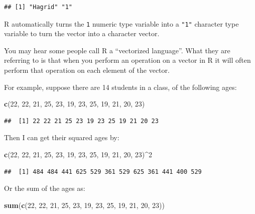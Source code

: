 \documentclass[
]{book}
\newenvironment{Shaded}{\begin{snugshade}}{\end{snugshade}}
\newcommand{\DecValTok}[1]{\textcolor[rgb]{0.00,0.00,0.81}{#1}}
\newcommand{\FunctionTok}[1]{\textcolor[rgb]{0.13,0.29,0.53}{\textbf{#1}}}
\newcommand{\NormalTok}[1]{#1}
\newcommand{\SpecialCharTok}[1]{\textcolor[rgb]{0.81,0.36,0.00}{\textbf{#1}}}
\begin{document}
\begin{verbatim}
## [1] "Hagrid" "1"
\end{verbatim}

R automatically turns the \texttt{1} numeric type variable into a \texttt{"1"} character type variable to turn the vector into a character vector.

You may hear some people call R a ``vectorized language''. What they are referring to is that when you perform an operation on a vector in R it will often perform that operation on each element of the vector.

For example, suppose there are 14 students in a class, of the following ages:

\begin{Shaded}
\begin{Highlighting}[]
\FunctionTok{c}\NormalTok{(}\DecValTok{22}\NormalTok{, }\DecValTok{22}\NormalTok{, }\DecValTok{21}\NormalTok{, }\DecValTok{25}\NormalTok{, }\DecValTok{23}\NormalTok{, }\DecValTok{19}\NormalTok{, }\DecValTok{23}\NormalTok{, }\DecValTok{25}\NormalTok{, }\DecValTok{19}\NormalTok{, }\DecValTok{21}\NormalTok{, }\DecValTok{20}\NormalTok{, }\DecValTok{23}\NormalTok{)}
\end{Highlighting}
\end{Shaded}

\begin{verbatim}
##  [1] 22 22 21 25 23 19 23 25 19 21 20 23
\end{verbatim}

Then I can get their squared ages by:

\begin{Shaded}
\begin{Highlighting}[]
\FunctionTok{c}\NormalTok{(}\DecValTok{22}\NormalTok{, }\DecValTok{22}\NormalTok{, }\DecValTok{21}\NormalTok{, }\DecValTok{25}\NormalTok{, }\DecValTok{23}\NormalTok{, }\DecValTok{19}\NormalTok{, }\DecValTok{23}\NormalTok{, }\DecValTok{25}\NormalTok{, }\DecValTok{19}\NormalTok{, }\DecValTok{21}\NormalTok{, }\DecValTok{20}\NormalTok{, }\DecValTok{23}\NormalTok{)}\SpecialCharTok{\^{}}\DecValTok{2}
\end{Highlighting}
\end{Shaded}

\begin{verbatim}
##  [1] 484 484 441 625 529 361 529 625 361 441 400 529
\end{verbatim}

Or the sum of the ages as:

\begin{Shaded}
\begin{Highlighting}[]
\FunctionTok{sum}\NormalTok{(}\FunctionTok{c}\NormalTok{(}\DecValTok{22}\NormalTok{, }\DecValTok{22}\NormalTok{, }\DecValTok{21}\NormalTok{, }\DecValTok{25}\NormalTok{, }\DecValTok{23}\NormalTok{, }\DecValTok{19}\NormalTok{, }\DecValTok{23}\NormalTok{, }\DecValTok{25}\NormalTok{, }\DecValTok{19}\NormalTok{, }\DecValTok{21}\NormalTok{, }\DecValTok{20}\NormalTok{, }\DecValTok{23}\NormalTok{))}
\end{Highlighting}
\end{Shaded}
\end{document}
